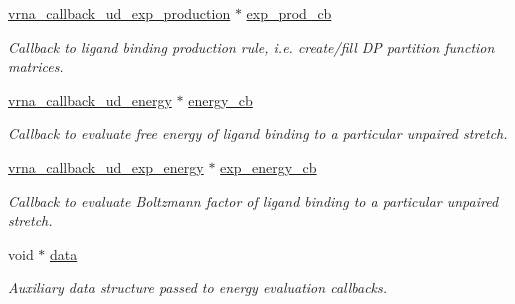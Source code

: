 \begin{DoxyCompactItemize}
\mbox{\label{group__domains__up_a181ae6ec67f77e68899ec6a0780f3e01}} 
\mbox{\hyperlink{group__domains__up_ga33d78327dcd04c1ca5ab2887edc18c7b}{vrna\+\_\+callback\+\_\+ud\+\_\+exp\+\_\+production}} $\ast$ \mbox{\hyperlink{group__domains__up_a181ae6ec67f77e68899ec6a0780f3e01}{exp\+\_\+prod\+\_\+cb}}
\begin{DoxyCompactList}\small\item\em Callback to ligand binding production rule, i.\+e. create/fill DP partition function matrices. \end{DoxyCompactList}\item 
\mbox{\label{group__domains__up_a1efba765dd4ea893dc8bd7362761f99b}} 
\mbox{\hyperlink{group__domains__up_ga75825c57d0bfde4ae4f95c044260c5c3}{vrna\+\_\+callback\+\_\+ud\+\_\+energy}} $\ast$ \mbox{\hyperlink{group__domains__up_a1efba765dd4ea893dc8bd7362761f99b}{energy\+\_\+cb}}
\begin{DoxyCompactList}\small\item\em Callback to evaluate free energy of ligand binding to a particular unpaired stretch. \end{DoxyCompactList}\item 
\mbox{\label{group__domains__up_ad5aaa2530557880ae89e297f8f09aa55}} 
\mbox{\hyperlink{group__domains__up_ga861706f257ba993753464b823e65b86e}{vrna\+\_\+callback\+\_\+ud\+\_\+exp\+\_\+energy}} $\ast$ \mbox{\hyperlink{group__domains__up_ad5aaa2530557880ae89e297f8f09aa55}{exp\+\_\+energy\+\_\+cb}}
\begin{DoxyCompactList}\small\item\em Callback to evaluate Boltzmann factor of ligand binding to a particular unpaired stretch. \end{DoxyCompactList}\item 
\mbox{\label{group__domains__up_a8802b1b0512999a9f35202031811ce17}} 
void $\ast$ \mbox{\hyperlink{group__domains__up_a8802b1b0512999a9f35202031811ce17}{data}}
\begin{DoxyCompactList}\small\item\em Auxiliary data structure passed to energy evaluation callbacks. \end{DoxyCompactList}\item 
\mbox{\label{group__domains__up_a21b3084846902172858bc53f113d05a4}} 

\end{DoxyCompactItemize}
